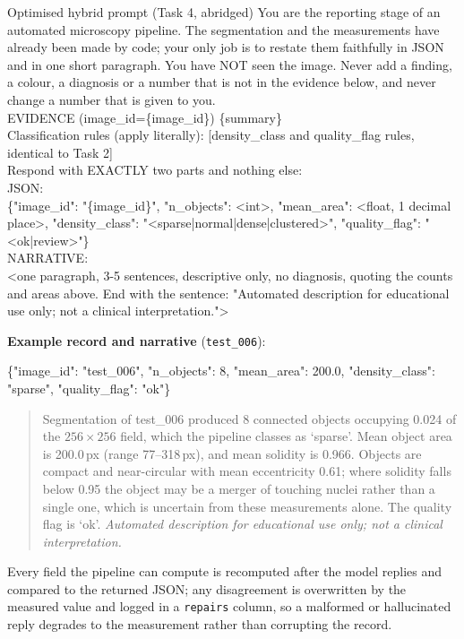 \documentclass[a4paper,9pt,twocolumn]{extarticle}
\begin{document}
\begin{prompt}{Optimised hybrid prompt (Task 4, abridged)}
\scriptsize\ttfamily
You are the reporting stage of an automated microscopy pipeline. The
segmentation and the measurements have already been made by code; your only job
is to restate them faithfully in JSON and in one short paragraph. You have NOT
seen the image. Never add a finding, a colour, a diagnosis or a number that is
not in the evidence below, and never change a number that is given to
you.\\[2pt]
EVIDENCE (image\_id=\{image\_id\}) \{summary\}\\[2pt]
Classification rules (apply literally): [density\_class and quality\_flag rules,
identical to Task 2]\\[2pt]
Respond with EXACTLY two parts and nothing else:\\
JSON:\\
\{"image\_id": "\{image\_id\}", "n\_objects": <int>, "mean\_area": <float, 1
decimal place>, "density\_class": "<sparse|normal|dense|clustered>",
"quality\_flag": "<ok|review>"\}\\
NARRATIVE:\\
<one paragraph, 3-5 sentences, descriptive only, no diagnosis, quoting the
counts and areas above. End with the sentence: "Automated description for
educational use only; not a clinical interpretation.">
\end{prompt}

\textbf{Example record and narrative} (\texttt{test\_006}):

{\footnotesize\ttfamily\{"image\_id": "test\_006", "n\_objects": 8,
"mean\_area": 200.0, "density\_class": "sparse", "quality\_flag": "ok"\}}

\begin{quote}\footnotesize
Segmentation of test\_006 produced 8 connected objects occupying 0.024 of the
$256\times256$ field, which the pipeline classes as `sparse'. Mean object area
is 200.0\,px (range 77--318\,px), and mean solidity is 0.966. Objects are
compact and near-circular with mean eccentricity 0.61; where solidity falls
below 0.95 the object may be a merger of touching nuclei rather than a single
one, which is uncertain from these measurements alone. The quality flag is
`ok'. \textit{Automated description for educational use only; not a clinical
interpretation.}
\end{quote}

Every field the pipeline can compute is recomputed after the model replies and
compared to the returned JSON; any disagreement is overwritten by the measured
value and logged in a \texttt{repairs} column, so a malformed or hallucinated
reply degrades to the measurement rather than corrupting the record.
\end{document}
